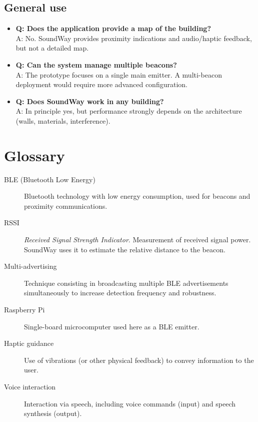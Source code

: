 \documentclass[12pt,a4paper]{article}
\begin{document}
\subsection{General use}

\begin{itemize}
    \item \textbf{Q: Does the application provide a map of the building?}\\
    A: No. SoundWay provides proximity indications and audio/haptic feedback, but not a detailed map.

    \item \textbf{Q: Can the system manage multiple beacons?}\\
    A: The prototype focuses on a single main emitter. A multi-beacon deployment would require more advanced configuration.

    \item \textbf{Q: Does SoundWay work in any building?}\\
    A: In principle yes, but performance strongly depends on the architecture (walls, materials, interference).
\end{itemize}

\newpage
\section{Glossary}

\begin{description}
    \item[BLE (Bluetooth Low Energy)] Bluetooth technology with low energy consumption, used for beacons and proximity communications.

    \item[RSSI] \textit{Received Signal Strength Indicator}. Measurement of received signal power. SoundWay uses it to estimate the relative distance to the beacon.

    \item[Multi-advertising] Technique consisting in broadcasting multiple BLE advertisements simultaneously to increase detection frequency and robustness.

    \item[Raspberry Pi] Single-board microcomputer used here as a BLE emitter.

    \item[Haptic guidance] Use of vibrations (or other physical feedback) to convey information to the user.

    \item[Voice interaction] Interaction via speech, including voice commands (input) and speech synthesis (output).
\end{description}
\end{document}
